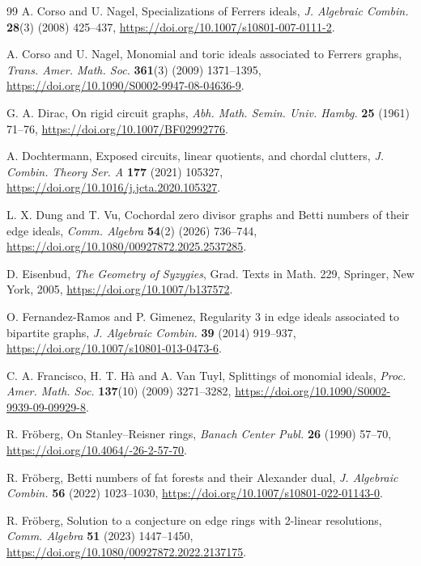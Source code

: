\documentclass[12pt]{article}
\theoremstyle{definition}
\begin{document}
\begin{thebibliography}{99}
A. Corso and U. Nagel,
Specializations of Ferrers ideals,
\emph{J. Algebraic Combin.} \textbf{28}(3) (2008) 425--437,
\url{https://doi.org/10.1007/s10801-007-0111-2}.

A. Corso and U. Nagel,
Monomial and toric ideals associated to Ferrers graphs,
\emph{Trans. Amer. Math. Soc.} \textbf{361}(3) (2009) 1371--1395,
\url{https://doi.org/10.1090/S0002-9947-08-04636-9}.

G. A. Dirac,
On rigid circuit graphs,
\emph{Abh. Math. Semin. Univ. Hambg.} \textbf{25} (1961) 71--76,
\url{https://doi.org/10.1007/BF02992776}.

A. Dochtermann,
Exposed circuits, linear quotients, and chordal clutters,
\emph{J. Combin. Theory Ser. A} \textbf{177} (2021) 105327,
\url{https://doi.org/10.1016/j.jcta.2020.105327}.

L. X. Dung and T. Vu,
Cochordal zero divisor graphs and Betti numbers of their edge ideals,
\emph{Comm. Algebra} \textbf{54}(2) (2026) 736--744,
\url{https://doi.org/10.1080/00927872.2025.2537285}.

D. Eisenbud,
\emph{The Geometry of Syzygies},
Grad. Texts in Math. 229, Springer, New York, 2005,
\url{https://doi.org/10.1007/b137572}.

O. Fernandez-Ramos and P. Gimenez,
Regularity \(3\) in edge ideals associated to bipartite graphs,
\emph{J. Algebraic Combin.} \textbf{39} (2014) 919--937,
\url{https://doi.org/10.1007/s10801-013-0473-6}.

C. A. Francisco, H. T. H\`a and A. Van Tuyl,
Splittings of monomial ideals,
\emph{Proc. Amer. Math. Soc.} \textbf{137}(10) (2009) 3271--3282,
\url{https://doi.org/10.1090/S0002-9939-09-09929-8}.

R. Fröberg,
On Stanley--Reisner rings,
\emph{Banach Center Publ.} \textbf{26} (1990) 57--70,
\url{https://doi.org/10.4064/-26-2-57-70}.

R. Fröberg,
Betti numbers of fat forests and their Alexander dual,
\emph{J. Algebraic Combin.} \textbf{56} (2022) 1023--1030,
\url{https://doi.org/10.1007/s10801-022-01143-0}.

R. Fröberg,
Solution to a conjecture on edge rings with 2-linear resolutions,
\emph{Comm. Algebra} \textbf{51} (2023) 1447--1450,
\url{https://doi.org/10.1080/00927872.2022.2137175}.


\end{thebibliography}
\end{document}
